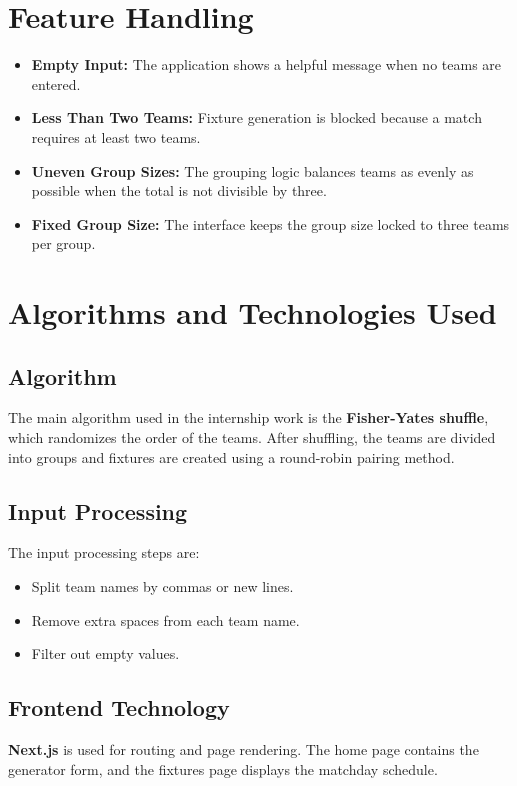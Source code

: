 \documentclass[12pt,a4paper]{report}
\begin{document}
\section{Feature Handling}
\begin{itemize}
    \item \textbf{Empty Input:} The application shows a helpful message when no teams are entered.
    \item \textbf{Less Than Two Teams:} Fixture generation is blocked because a match requires at least two teams.
    \item \textbf{Uneven Group Sizes:} The grouping logic balances teams as evenly as possible when the total is not divisible by three.
    \item \textbf{Fixed Group Size:} The interface keeps the group size locked to three teams per group.
\end{itemize}

\section{Algorithms and Technologies Used}

\subsection{Algorithm}
The main algorithm used in the internship work is the \textbf{Fisher-Yates shuffle}, which randomizes the order of the teams. After shuffling, the teams are divided into groups and fixtures are created using a round-robin pairing method.

\subsection{Input Processing}
The input processing steps are:
\begin{itemize}
    \item Split team names by commas or new lines.
    \item Remove extra spaces from each team name.
    \item Filter out empty values.
\end{itemize}

\subsection{Frontend Technology}
\textbf{Next.js} is used for routing and page rendering. The home page contains the generator form, and the fixtures page displays the matchday schedule.
\end{document}
